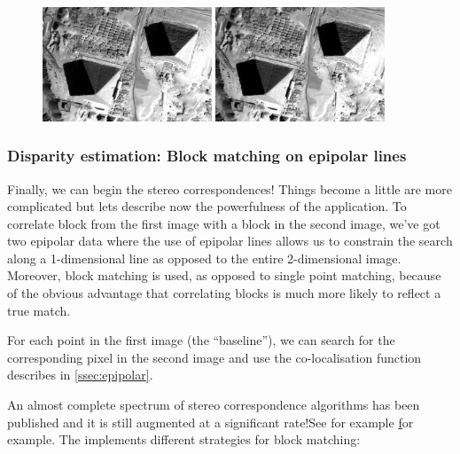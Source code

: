 \begin{figure}[!h]
  \center
  \includegraphics[width=0.45\textwidth]{../Art/MonteverdiImages/stereo_image1_epipolar.png}
  \includegraphics[width=0.45\textwidth]{../Art/MonteverdiImages/stereo_image2_epipolar.png}
  \label{fig:MeanShiftVectorImageFilter}
\end{figure}

\subsubsection{Disparity estimation: Block matching on epipolar lines}

Finally, we can begin the stereo correspondences! Things become a little are
more complicated but lets describe now the powerfulness of the
 application.  To correlate block from the first
image with a block in the second image, we've got two epipolar data where the
use of epipolar lines allows us to constrain the search along a 1-dimensional
line as opposed to the entire 2-dimensional image. Moreover, block matching is
used, as opposed to single point matching, because of the obvious advantage that
correlating blocks is much more likely to reflect a true match.

For each point in the first image (the ``baseline''), we can search for the
corresponding pixel in the second image and use the co-localisation function
describes in \ref{ssec:epipolar}.

An almost complete spectrum of stereo correspondence algorithms has been
published and it is still augmented at a significant rate!See for example
\href{http://en.wikipedia.org/wiki/Block-matching_algorithm} for example. The
\otb implements different strategies for block matching:

